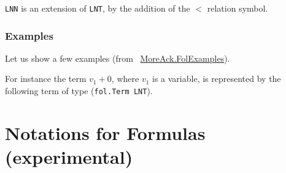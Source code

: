 \texttt{LNN} is an extension of \texttt{LNT}, by the addition 
of the $<$ relation symbol.





\subsubsection{Examples}

Let us show a few examples (from ~\href{../theories/html/hydras.MoreAck.FolExamples.html}{MoreAck.FolExamples}).

 
















For instance the term $v_1+0$, where $v_1$ is a variable,
is represented by the following \gallina term of type 
(\texttt{fol.Term LNT}).








\section{Notations for Formulas (experimental)}

